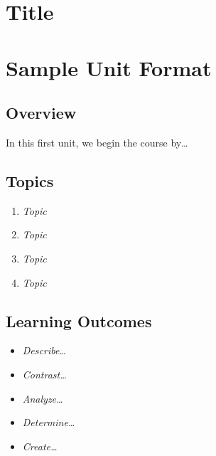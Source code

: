 \documentclass[
]{book}
\providecommand{\tightlist}{%
  \setlength{\itemsep}{0pt}\setlength{\parskip}{0pt}}
\begin{document}
\hypertarget{title-4}{%
\chapter{Title}\label{title-4}}

\hypertarget{sample-unit-format}{%
\chapter*{Sample Unit Format}\label{sample-unit-format}}

\hypertarget{overview-1}{%
\section*{Overview}\label{overview-1}}

In this first unit, we begin the course by\ldots{}

\hypertarget{topics-1}{%
\section*{Topics}\label{topics-1}}

\begin{enumerate}
\def\labelenumi{\arabic{enumi}.}
\tightlist
\item
  \emph{Topic}\\
\item
  \emph{Topic}\\
\item
  \emph{Topic}\\
\item
  \emph{Topic}
\end{enumerate}

\hypertarget{learning-outcomes-1}{%
\section*{Learning Outcomes}\label{learning-outcomes-1}}

\begin{itemize}
\tightlist
\item
  \emph{Describe\ldots{}}
\item
  \emph{Contrast\ldots{}}
\item
  \emph{Analyze\ldots{}}
\item
  \emph{Determine\ldots{}}
\item
  \emph{Create\ldots{}}
\end{itemize}
\end{document}
